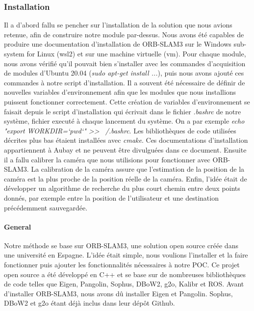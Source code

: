 \documentclass[11pt]{article}
\begin{document}
      \subsubsection{Installation}
        Il a d'abord fallu se pencher sur l'installation de la solution que nous avions retenue, afin de construire notre module par-dessus.
        Nous avons été capables de produire une documentation d'installation de ORB-SLAM3 sur le Windows sub-system for Linux (\acrshort{wsl2})
        et sur une machine virtuelle (\acrshort{vm}).
        Pour chaque module, nous avons vérifié qu'il pouvait bien s'installer avec les commandes d'acquisition de modules d'Ubuntu 20.04 
        (\textit{sudo apt-get install ...}), 
        puis nous avons ajouté ces commandes à notre script d'installation. Il a souvent été nécessaire de définir de nouvelles variables d'environnement
        afin que les modules que nous installions puissent fonctionner correctement. Cette création de variables d'environnement se faisait depuis le script d'installation
        qui écrivait dans le fichier \textit{.bashrc} de notre système, fichier executé à chaque lancement du système. 
        On a par exemple \textit{echo "export WORKDIR=`pwd`" >> ~/.bashrc}. Les bibliothèques de code utilisées décrites plus bas étaient installées avec \textit{cmake}.
        Ces documentations d'installation appartiennent à Aubay et ne peuvent être divulguées dans
        ce document.
        Ensuite il a fallu calibrer la caméra que nous utilisions pour fonctionner avec ORB-SLAM3. 
        La calibration de la caméra assure que l'estimation de la position de la caméra est la plus proche de la position réelle de la caméra.
        Enfin, l'idée était de développer un algorithme de recherche du plus court chemin entre deux points donnés, par exemple entre la position
        de l'utilisateur et une destination précédemment sauvegardée.      
            
     
        \paragraph{General}
          Notre méthode se base sur ORB-SLAM3, une solution open source créée dans une université en Espagne. L'idée était simple, nous voulions
          l'installer et la faire fonctionner puis ajouter les fonctionnalités nécessaires à notre POC. Ce projet open source a été
          développé en C++ et se base sur de nombreuses bibliothèques de code telles que Eigen, Pangolin, Sophus, DBoW2, g2o, Kalibr et ROS.
          Avant d'installer ORB-SLAM3, nous avons dû installer Eigen et Pangolin. Sophus, DBoW2 et g2o étant déjà inclus dans leur dépôt Github.
\end{document}
